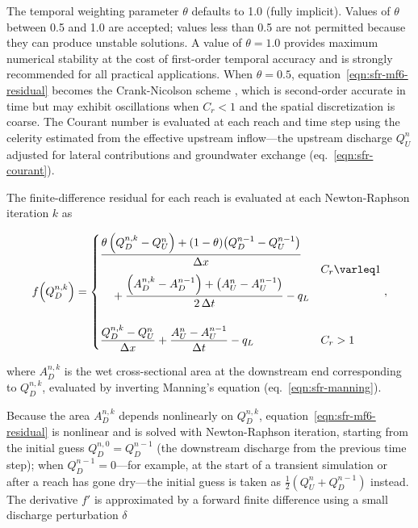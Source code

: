 The temporal weighting parameter $\theta$ defaults to 1.0 (fully implicit). Values of $\theta$ between 0.5 and 1.0 are accepted; values less than 0.5 are not permitted because they can produce unstable solutions. A value of $\theta = 1.0$ provides maximum numerical stability at the cost of first-order temporal accuracy and is strongly recommended for all practical applications. When $\theta = 0.5$, equation~\ref{eqn:sfr-mf6-residual} becomes the Crank-Nicolson scheme \citep{CrankNicolson1947}, which is second-order accurate in time but may exhibit oscillations when $C_r < 1$ and the spatial discretization is coarse. The Courant number is evaluated at each reach and time step using the celerity estimated from the effective upstream inflow---the upstream discharge $Q_U^n$ adjusted for lateral contributions and groundwater exchange (eq.~\ref{eqn:sfr-courant}).

The finite-difference residual for each reach is evaluated at each Newton-Raphson iteration $k$ as

\begin{equation}
	\label{eqn:sfr-mf6-residual}
	f\!\left(Q_D^{n,k}\right) =
	\begin{dcases}
		\begin{aligned}
			&\dfrac{\theta \left(Q_D^{n,k} - Q_U^n\right) + \left(1-\theta\right)\!\left(Q_D^{n-1} - Q_U^{n-1}\right)}{\Delta x} \\[4pt]
			&\quad + \dfrac{\left(A_D^{n,k} - A_D^{n-1}\right) + \left(A_U^n - A_U^{n-1}\right)}{2\,\Delta t} - q_L
		\end{aligned}
		& C_r \le 1 \\[12pt]
		\dfrac{Q_D^{n,k} - Q_U^n}{\Delta x}
		+ \dfrac{A_U^n - A_U^{n-1}}{\Delta t} - q_L
		& C_r > 1
	\end{dcases} ,
\end{equation}

\noindent where $A_D^{n,k}$ is the wet cross-sectional area at the downstream end corresponding to $Q_D^{n,k}$, evaluated by inverting Manning's equation (eq.~\ref{eqn:sfr-manning}).

Because the area $A_D^{n,k}$ depends nonlinearly on $Q_D^{n,k}$, equation~\ref{eqn:sfr-mf6-residual} is nonlinear and is solved with Newton-Raphson iteration, starting from the initial guess $Q_D^{n,0} = Q_D^{n-1}$ (the downstream discharge from the previous time step); when $Q_D^{n-1} = 0$---for example, at the start of a transient simulation or after a reach has gone dry---the initial guess is taken as $\tfrac{1}{2}(Q_U^n + Q_D^{n-1})$ instead. The derivative $f'$ is approximated by a forward finite difference using a small discharge perturbation $\delta$

